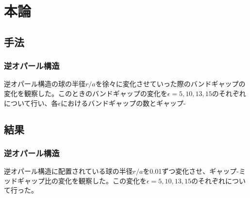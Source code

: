 \documentclass[platex,dvipdfmx]{jsreport}
\numberwithin{equation}{section}
\begin{document}
\chapter{本論}

\section{手法}
\subsection{逆オパール構造}
逆オパール構造の球の半径$r / a$を徐々に変化させていった際のバンドギャップの変化を観察した。このときのバンドギャップの変化を$\epsilon = 5, 10, 13, 15$のそれぞれについて行い、各$\epsilon$におけるバンドギャップの数とギャップ-



\section{結果}
\subsection{逆オパール構造}
逆オパール構造に配置されている球の半径$r / a$を0.01ずつ変化させ、ギャップ-ミッドギャップ比の変化を観察した。この変化を$\epsilon = 5, 10, 13, 15$のそれぞれについて行った。
\end{document}
